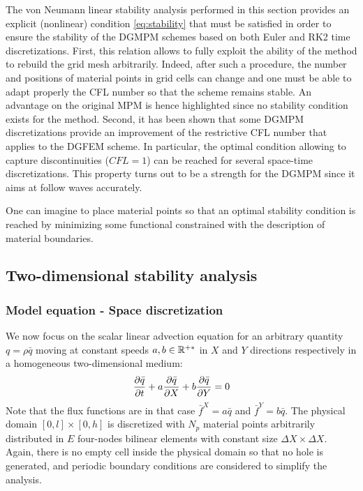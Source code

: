 The von Neumann linear stability analysis performed in this section provides an explicit (nonlinear) condition \eqref{eq:stability} that must be satisfied in order to ensure the stability of the DGMPM schemes based on both Euler and RK2 time discretizations. First, this relation allows to fully exploit the ability of the method to rebuild the grid mesh arbitrarily. Indeed, after such a procedure, the number and positions of material points in grid cells can change and one must be able to adapt properly the CFL number so that the scheme remains stable. An advantage on the original MPM is hence highlighted since no stability condition exists for the method. Second, it has been shown that some DGMPM discretizations provide an improvement of the restrictive CFL number that applies to the DGFEM scheme. In particular, the optimal condition allowing to capture discontinuities ($CFL=1$) can be reached for several space-time discretizations. This property turns out to be a strength for the DGMPM since it aims at follow waves accurately.

One can imagine to place material points so that an optimal stability condition is reached by minimizing some functional constrained with the description of material boundaries.

\subsection{Two-dimensional stability analysis}
\subsubsection*{Model equation - Space discretization}
We now focus on the scalar linear advection equation for an arbitrary quantity $q=\rho \bar{q}$ moving at constant speeds $a,b \in \mathbb{R}^{+*}$ in $X$ and $Y$ directions respectively in a homogeneous two-dimensional medium:
\begin{equation}
  \label{eq:2D_model_equation}
  \frac{\partial \bar{q}}{\partial t} + a\frac{\partial \bar{q}}{\partial X} + b\frac{\partial \bar{q}}{\partial Y}= 0
\end{equation}
Note that the flux functions are in that case $\bar{f}^X = a\bar{q}$ and $\bar{f}^Y = b\bar{q}$. The physical domain $[0,l]\times[0,h]$ is discretized with $N_p$ material points arbitrarily distributed in $E$ four-nodes bilinear elements with constant size $\Delta X \times \Delta X$. Again, there is no empty cell inside the physical domain so that no hole is generated, and periodic boundary conditions are considered to simplify the analysis.

